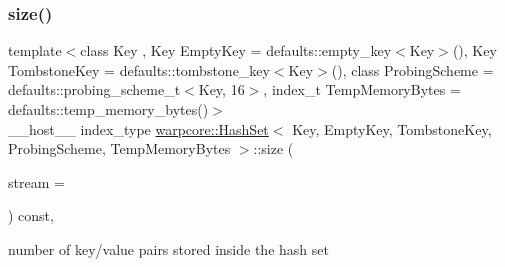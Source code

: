 \subsubsection{\texorpdfstring{size()}{size()}}
{\footnotesize\ttfamily template$<$class Key , Key Empty\+Key = defaults\+::empty\+\_\+key$<$\+Key$>$(), Key Tombstone\+Key = defaults\+::tombstone\+\_\+key$<$\+Key$>$(), class Probing\+Scheme  = defaults\+::probing\+\_\+scheme\+\_\+t$<$\+Key, 16$>$, index\+\_\+t Temp\+Memory\+Bytes = defaults\+::temp\+\_\+memory\+\_\+bytes()$>$ \\
\+\_\+\+\_\+host\+\_\+\+\_\+ index\+\_\+type \hyperlink{classwarpcore_1_1HashSet}{warpcore\+::\+Hash\+Set}$<$ Key, Empty\+Key, Tombstone\+Key, Probing\+Scheme, Temp\+Memory\+Bytes $>$\+::size (\begin{DoxyParamCaption}\item[{cuda\+Stream\+\_\+t}]{stream = {} }\end{DoxyParamCaption}) const\hspace{0.3cm}{\ttfamily [inline]}, {\ttfamily [noexcept]}}



number of key/value pairs stored inside the hash set 

